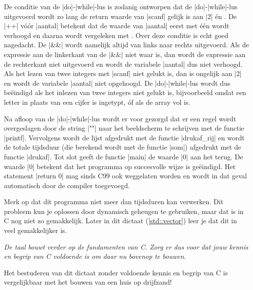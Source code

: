 \begin{clstShortInline}
\begin{itemize}
	De conditie van de |do|\hyp{}|while|\hyp{}lus is zodanig ontworpen dat de |do|\hyp{}|while|\hyp{}lus uitgevoerd wordt zo lang de return waarde van |scanf| gelijk is aan |2| én .
	De |++| vóór |aantal| betekent dat de waarde van |aantal| eerst met één wordt verhoogd en daarna wordt vergeleken met .
	Over deze conditie is echt goed nagedacht.
	De |&&| wordt namelijk altijd van links naar rechts uitgevoerd.
	Als de expressie aan de linkerkant van de |&&| niet waar is, dan wordt de expressie aan de rechterkant niet uitgevoerd en wordt de variabele |aantal| dus niet verhoogd.
	Als het lezen van twee integers met |scanf| niet gelukt is, dan is  ongelijk aan |2| en wordt de variabele |aantal| niet opgehoogd.
	De |do|\hyp{}|while|\hyp{}lus wordt dus beëindigd als het inlezen van twee integers niet gelukt is, bijvoorbeeld omdat een letter in plaats van een cijfer is ingetypt, óf als de array vol is.
	
	Na afloop van de |do|\hyp{}|while|\hyp{}lus wordt er voor gezorgd dat er een regel wordt overgeslagen door de string |"\n"| naar het beeldscherm te schrijven met de functie |printf|.
	Vervolgens wordt de lijst afgedrukt met de functie |drukaf_rij| en wordt de totale tijdsduur (die berekend wordt met de functie |som|) afgedrukt met de functie |drukaf|.
	Tot slot geeft de functie |main| de waarde |0| aan het  terug.
	De waarde |0| betekent dat het programma op succesvolle wijze is geëindigd.
	Het statement |return 0| mag sinds C99 ook weggelaten worden en wordt in dat geval automatisch door de compiler toegevoegd.
\end{itemize}

Merk op dat dit programma niet meer dan  tijdsduren kan verwerken.
Dit probleem kun je oplossen door dynamisch geheugen te gebruiken, maar dat is in C nog niet zo gemakkelijk.
Later in dit dictaat (\cref{std::vector}) leer je dat dit in \Cpp{} veel gemakkelijker is.

\emph{De taal \Cpp{} bouwt verder op de fundamenten van C.
Zorg er dus voor dat jouw kennis en begrip van C voldoende is om daar nu \Cpp{} bovenop te bouwen.}

Het bestuderen van dit dictaat zonder voldoende kennis en begrip van C is vergelijkbaar met het bouwen van een huis op drijfzand!
\end{clstShortInline}

